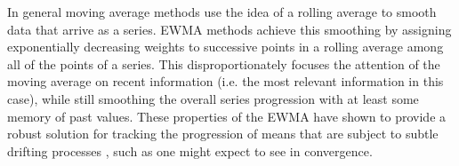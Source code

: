 \documentclass[12pt]{article}
\begin{document}
	In general moving average methods use the idea of a rolling average to smooth data that arrive as a series. %
	EWMA methods achieve this smoothing by assigning exponentially decreasing weights to successive points in a rolling average among all of the points of a series. 
	This disproportionately focuses the attention of the moving average on recent information (i.e. the most relevant information in this case), while still smoothing the overall series progression with at least some memory of past values. %
	These properties of the EWMA have shown to provide a robust solution for tracking the progression of means that are subject to subtle drifting processes \cite{adaptEWMA}, such as one might expect to see in convergence.
	
	
\end{document}
